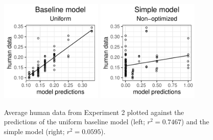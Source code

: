 \documentclass[11pt,a4paper]{article}
\begin{document}
\begin{figure}[ht]
	\centering
	\includegraphics[width=2in]{images/x3_m20.pdf}
	\includegraphics[width=2in]{images/x3_m7.pdf}
	\caption{Average human data from Experiment 2 plotted against the predictions of the uniform baseline model (left; $r^2=0.7467$) and the simple model (right; $r^2=0.0595$). 
	}
	\label{base-nonopt-x3}
\end{figure}
\end{document}
